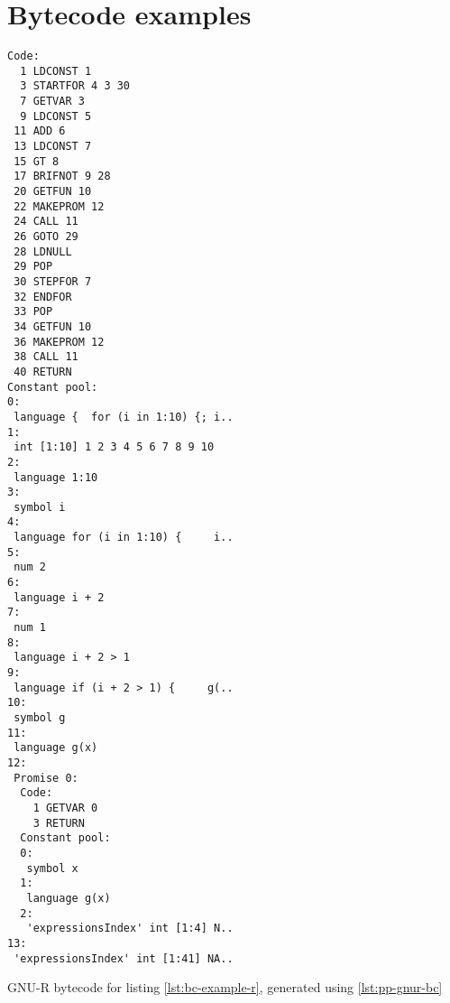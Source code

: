 \chapter{Bytecode examples}\label{ch:appendix-bc}

\begin{listing}[h]
	\begin{multicols}{2}
		\begin{verbatim}
Code:
  1 LDCONST 1
  3 STARTFOR 4 3 30
  7 GETVAR 3
  9 LDCONST 5
 11 ADD 6
 13 LDCONST 7
 15 GT 8
 17 BRIFNOT 9 28
 20 GETFUN 10
 22 MAKEPROM 12
 24 CALL 11
 26 GOTO 29
 28 LDNULL
 29 POP
 30 STEPFOR 7
 32 ENDFOR
 33 POP
 34 GETFUN 10
 36 MAKEPROM 12
 38 CALL 11
 40 RETURN
Constant pool:
0:
 language {  for (i in 1:10) {; i..
1:
 int [1:10] 1 2 3 4 5 6 7 8 9 10
2:
 language 1:10
3:
 symbol i
4:
 language for (i in 1:10) {     i..
5:
 num 2
6:
 language i + 2
7:
 num 1
8:
 language i + 2 > 1
9:
 language if (i + 2 > 1) {     g(..
10:
 symbol g
11:
 language g(x)
12:
 Promise 0:
  Code:
    1 GETVAR 0
    3 RETURN
  Constant pool:
  0:
   symbol x
  1:
   language g(x)
  2:
   'expressionsIndex' int [1:4] N..
13:
 'expressionsIndex' int [1:41] NA..
    \end{verbatim}
	\end{multicols}
	\caption{GNU-R bytecode for listing \ref{lst:bc-example-r}, generated using \ref{lst:pp-gnur-bc}}\label{lst:appendix-gnur}
\end{listing}

